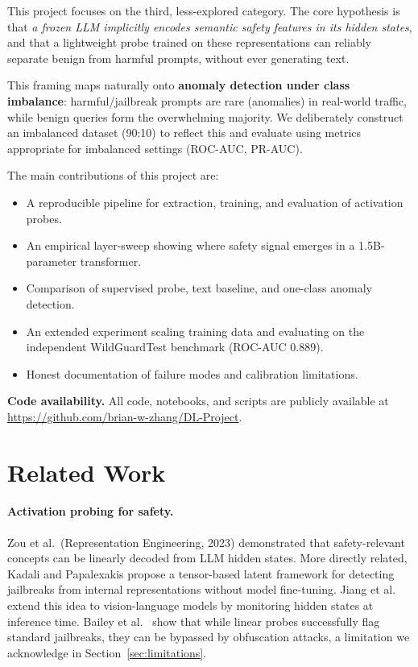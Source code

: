 \documentclass[11pt,a4paper]{article}
\begin{document}
This project focuses on the third, less-explored category. The core hypothesis is that
\emph{a frozen LLM implicitly encodes semantic safety features in its hidden states},
and that a lightweight probe trained on these representations can reliably separate
benign from harmful prompts, without ever generating text.

This framing maps naturally onto \textbf{anomaly detection under class imbalance}:
harmful/jailbreak prompts are rare (anomalies) in real-world traffic, while benign
queries form the overwhelming majority. We deliberately construct an imbalanced dataset
(90:10) to reflect this and evaluate using metrics appropriate for imbalanced settings
(ROC-AUC, PR-AUC).

The main contributions of this project are:
\begin{itemize}[noitemsep]
  \item A reproducible pipeline for extraction, training, and evaluation of activation probes.
  \item An empirical layer-sweep showing where safety signal emerges in a 1.5B-parameter transformer.
  \item Comparison of supervised probe, text baseline, and one-class anomaly detection.
  \item An extended experiment scaling training data and evaluating on the independent WildGuardTest benchmark (ROC-AUC 0.889).
  \item Honest documentation of failure modes and calibration limitations.
\end{itemize}

\noindent\textbf{Code availability.} All code, notebooks, and scripts are publicly available at
\url{https://github.com/brian-w-zhang/DL-Project}.

\section{Related Work}

\paragraph{Activation probing for safety.}
Zou et al.\ (Representation Engineering, 2023) demonstrated that safety-relevant
concepts can be linearly decoded from LLM hidden states. More directly related,
Kadali and Papalexakis \cite{jailbreak_trace} propose a tensor-based latent framework
for detecting jailbreaks from internal representations without model fine-tuning.
Jiang et al.\ \cite{hiddendetect} extend this idea to vision-language models by
monitoring hidden states at inference time.
Bailey et al.\ \cite{obfuscated} show that while linear probes successfully flag
standard jailbreaks, they can be bypassed by obfuscation attacks, a limitation we
acknowledge in Section~\ref{sec:limitations}.
\end{document}
